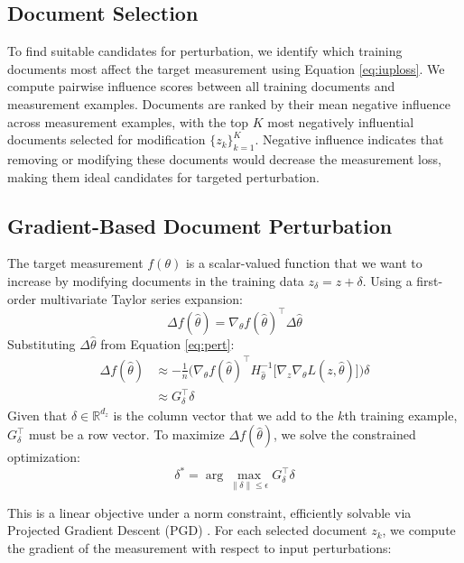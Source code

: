 \documentclass{article}
\theoremstyle{plain}
\theoremstyle{definition}
\theoremstyle{remark}
\begin{document}
\subsection{Document Selection}

To find suitable candidates for perturbation, we identify which training documents most affect the target measurement using Equation \ref{eq:iuploss}.
We compute pairwise influence scores between all training documents and measurement examples. Documents are ranked by their mean negative influence across measurement examples, with the top $K$ most negatively influential documents selected for modification $\{z_k\}_{k=1}^K$. Negative influence indicates that removing or modifying these documents would decrease the measurement loss, making them ideal candidates for targeted perturbation.

\subsection{Gradient-Based Document Perturbation}

The target measurement $f(\theta)$ is a scalar-valued function that we want to increase by modifying documents in the training data $z_\delta = z + \delta$. Using a first-order multivariate Taylor series expansion:
\begin{equation}
    \Delta f(\hat\theta) = \nabla_\theta f( \hat\theta )^\top \Delta\hat\theta
\end{equation}
Substituting $\Delta\hat\theta$ from Equation \ref{eq:pert}:
\begin{align}
    \Delta f(\hat\theta) &\approx -\frac{1}{n} \Big( \nabla_\theta f( \hat\theta )^\top 
     H_{\hat{\theta}}^{-1} \big[ \nabla_z \nabla_\theta L(z, \hat\theta)\big]\Big)\delta\\
     &\approx G_\delta^\top \delta
\end{align}
Given that $\delta \in \mathbb{R}^{d_z}$ is the column vector that we add to the $k$th training example,  $G_\delta^\top$ must be a row vector. To maximize $\Delta f(\hat\theta)$, we solve the constrained optimization:
\begin{equation}
\delta^* = \arg\max_{\|\delta\| \leq \epsilon} G_\delta^\top \delta
\end{equation}

This is a linear objective under a norm constraint, efficiently solvable via Projected Gradient Descent (PGD) \citep{madry2017towards}. For each selected document $z_k$, we compute the gradient of the measurement with respect to input perturbations:
\end{document}
